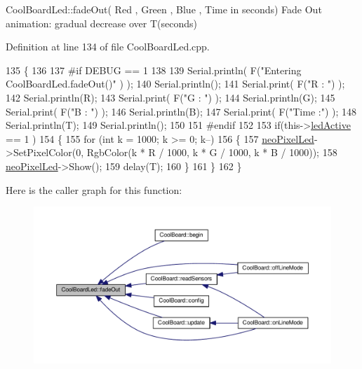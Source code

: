Cool\+Board\+Led\+::fade\+Out( Red , Green , Blue , Time in seconds) Fade Out animation\+: gradual decrease over T(seconds) 

Definition at line 134 of file Cool\+Board\+Led.\+cpp.


\begin{DoxyCode}
135 \{
136 
137 \textcolor{preprocessor}{#if DEBUG == 1 }
138 
139     Serial.println( F(\textcolor{stringliteral}{"Entering CoolBoardLed.fadeOut()"} ) );
140     Serial.println();
141     Serial.print( F(\textcolor{stringliteral}{"R : "}) );
142     Serial.println(R);
143     Serial.print( F(\textcolor{stringliteral}{"G : "}) );
144     Serial.println(G);
145     Serial.print( F(\textcolor{stringliteral}{"B : "}) );
146     Serial.println(B);
147     Serial.print( F(\textcolor{stringliteral}{"Time :"}) );
148     Serial.println(T);
149     Serial.println();
150 
151 \textcolor{preprocessor}{#endif  }
152 
153     \textcolor{keywordflow}{if}(this->\hyperlink{class_cool_board_led_a5f17c135516fcf4b44ea8a096ba0177a}{ledActive} == 1 )
154     \{
155         \textcolor{keywordflow}{for} (\textcolor{keywordtype}{int} k = 1000; k >= 0; k--) 
156         \{
157             \hyperlink{class_cool_board_led_ac2c13fa462a010cd9242bf297c013923}{neoPixelLed}->SetPixelColor(0, RgbColor(k * R / 1000, k * G / 1000, k * B / 1000));
158             \hyperlink{class_cool_board_led_ac2c13fa462a010cd9242bf297c013923}{neoPixelLed}->Show();
159             delay(T);
160         \}
161     \}
162 \}
\end{DoxyCode}
Here is the caller graph for this function\+:\nopagebreak
\begin{figure}[H]
\begin{center}
\leavevmode
\includegraphics[width=350pt]{de/dc0/class_cool_board_led_a93d545679237e8cc858324367149775c_icgraph}
\end{center}
\end{figure}
\mbox{\label{class_cool_board_led_a8ed3053a36f0ed4a131f43b5b17efb61}} 
